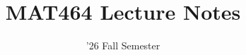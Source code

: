 \documentclass[11pt]{article}
\begin{document}
\title{MAT464 Lecture Notes}
\date{'26 Fall Semester} %
\maketitle

\setcounter{tocdepth}{1}
\tableofcontents
\newpage



\end{document}
